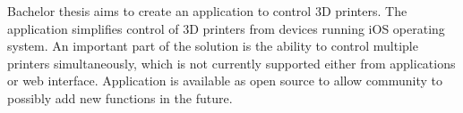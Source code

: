 Bachelor thesis aims to create an application to control 3D printers.
The application simplifies control of 3D printers from devices running iOS operating system.
An important part of the solution is the ability to control multiple printers simultaneously, which is not currently supported either from applications or web interface.
Application is available as open source to allow community to possibly add new functions in the future.
